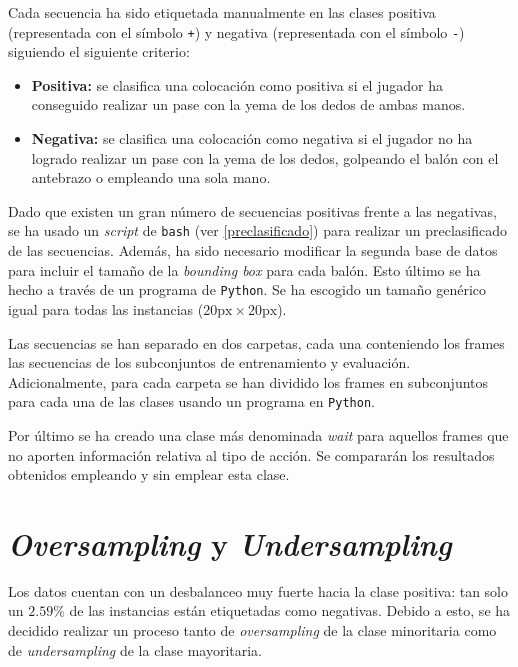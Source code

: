 \documentclass[12pt]{report} %
\begin{document}
    Cada secuencia ha sido etiquetada manualmente en las clases positiva
    (representada con el símbolo \verb!+!) y negativa (representada con el
    símbolo \verb!-!) siguiendo el siguiente criterio:
    \begin{itemize}
        \item \textbf{Positiva:} se clasifica una colocación como positiva si
        el jugador ha conseguido realizar un pase con la yema de los dedos de
        ambas manos.
        \item \textbf{Negativa:} se clasifica una colocación como negativa si
        el jugador no ha logrado realizar un pase con la yema de los dedos,
        golpeando el balón con el antebrazo o empleando una sola mano.
    \end{itemize}
    
    Dado que existen un gran número de secuencias positivas frente a las
    negativas, se ha usado un \textit{script} de \texttt{bash} (ver
    \ref{preclasificado}) para realizar un preclasificado de las secuencias.
    Además, ha sido necesario modificar la segunda base de datos para incluir
    el tamaño de la \textit{bounding box} para cada balón. Esto último se ha
    hecho a través de un programa de \texttt{Python}. Se ha escogido un 
    tamaño genérico igual para todas las instancias ($20\text{px}\times20\text{px}$).

    Las secuencias se han separado en dos carpetas, cada una conteniendo los
    frames las secuencias de los subconjuntos de entrenamiento y evaluación.
    Adicionalmente, para cada carpeta se han dividido los frames en subconjuntos
    para cada una de las clases usando un programa en \texttt{Python}.

    Por último se ha creado una clase más denominada \textit{wait} para
    aquellos frames que no aporten información relativa al tipo de acción. Se
    compararán los resultados obtenidos empleando y sin emplear esta clase.

    \section{\textit{Oversampling} y \textit{Undersampling}}

    Los datos cuentan con un desbalanceo muy fuerte hacia la clase positiva: tan
    solo un $2.59\%$ de las instancias están etiquetadas como negativas. Debido
    a esto, se ha decidido realizar un proceso tanto de \textit{oversampling} de la clase
    minoritaria como de \textit{undersampling} de la clase mayoritaria. 
\end{document}
